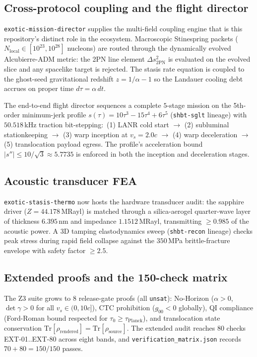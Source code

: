 \documentclass[aps,pra,10pt,onecolumn,superscriptaddress,nofootinbib,longbibliography,floatfix]{revtex4-2}
\newcommand{\ExoticGatePass}{70}%
\newcommand{\ExoticExtPass}{80}%
\newcommand{\ExoticExtTotal}{80}%
\newcommand{\ExoticFormalProofs}{8}%
\newcommand{\ExoticFormalStatus}{\texttt{unsat}}%
\newcommand{\ExoticBitStepKhz}{50.518}%
\newcommand{\ExoticFlightStages}{5}%
\newcommand{\ExoticMinJerkAcc}{5.7735}%
\newcommand{\ExoticAerogelNm}{6.395}%
\newcommand{\ExoticAerogelMatch}{0.985}%
\newcommand{\ExoticStressSF}{2.5}%
\newcommand{\ExoticFractureMpa}{350}%
\begin{document}
\subsection{Cross-protocol coupling and the flight director}

\texttt{exotic-mission-director} supplies the multi-field coupling engine
that is this repository's distinct role in the ecosystem.  Macroscopic
Stinespring packets ($N_{\mathrm{local}}\in[10^{23},10^{28}]$ nucleons) are
routed through the dynamically evolved Alcubierre-ADM metric: the 2PN line
element $\Delta s^2_{\mathrm{2PN}}$ is evaluated on the evolved slice and any
spacelike target is rejected.  The stasis rate equation is coupled to the
ghost-seed gravitational redshift $z=1/\alpha-1$ so the Landauer cooling debt
accrues on proper time $d\tau=\alpha\,dt$.

The end-to-end flight director sequences a complete $\ExoticFlightStages$-stage
mission on the 5th-order minimum-jerk profile
$s(\tau)=10\tau^3-15\tau^4+6\tau^5$ (\texttt{shbt-sglt} lineage) with
$\ExoticBitStepKhz$\,kHz traction bit-stepping:\
(1) LANR cold start $\to$ (2) subluminal stationkeeping $\to$ (3) warp
inception at $v_s=2.0c$ $\to$ (4) warp deceleration $\to$ (5) translocation
payload egress.  The profile's acceleration bound
$|s''|\le 10/\sqrt{3}\approx\ExoticMinJerkAcc$ is enforced in both the
inception and deceleration stages.

\subsection{Acoustic transducer FEA}

\texttt{exotic-stasis-thermo} now hosts the hardware transducer audit: the
sapphire driver ($Z=44.178$\,MRayl) is matched through a silica-aerogel
quarter-wave layer of thickness $\ExoticAerogelNm$\,nm and impedance
$1.1512$\,MRayl, transmitting $\ge\ExoticAerogelMatch$ of the acoustic power.
A 3D tamping elastodynamics sweep (\texttt{shbt-recon} lineage) checks peak
stress during rapid field collapse against the $\ExoticFractureMpa$\,MPa
brittle-fracture envelope with safety factor $\ge\ExoticStressSF$.

\subsection{Extended proofs and the 150-check matrix}

The Z3 suite grows to $\ExoticFormalProofs$ release-gate proofs (all
\ExoticFormalStatus): No-Horizon ($\alpha>0$, $\det\gamma>0$ for all
$v_s\in(0,10c]$), CTC prohibition ($g_{00}<0$ globally), QI compliance
(Ford-Roman bound respected for $\tau_0\ge\tau_{\mathrm{Planck}}$), and
translocation state conservation
$\mathrm{Tr}[\rho_{\mathrm{rendered}}]=\mathrm{Tr}[\rho_{\mathrm{source}}]$.
The extended audit reaches $\ExoticExtTotal$ checks EXT-01..EXT-80 across
eight bands, and \texttt{verification\_matrix.json} records
$\ExoticGatePass+\ExoticExtPass=150/150$ passes.
\end{document}
